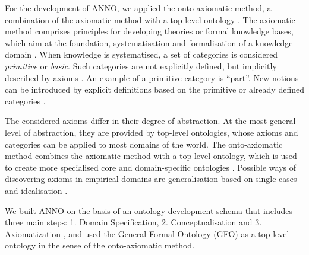 \documentclass[sw]{iosart2x}
\begin{document}

For the development of ANNO, we applied the onto-axiomatic method, a combination of the axiomatic method with a top-level ontology \citep{baumann2014, herre2010}.
The axiomatic method comprises principles for developing theories or formal knowledge bases, which aim at the foundation, systematisation and formalisation of a knowledge domain \citep{baumann2014, herre2010}.
When knowledge is systematised, a set of categories is considered \emph{primitive} or \emph{basic}.
Such categories are not explicitly defined, but implicitly described by axioms \citep{Hilbert1918}.
An example of a primitive category is \enquote{part}.
New notions can be introduced by explicit definitions based on the primitive or already defined categories \citep{herre2010}.

The considered axioms differ in their degree of abstraction.
At the most general level of abstraction, they are provided by top-level ontologies, whose axioms and categories can be applied to most domains of the world.
The onto-axiomatic method combines the axiomatic method with a top-level ontology, which is used to create more specialised core and domain-specific ontologies \citep{baumann2014}.
Possible ways of discovering axioms in empirical domains are generalisation based on single cases and idealisation \citep{baumann2011}.

We built ANNO on the basis of an ontology development schema that includes three main steps: 1. Domain Specification, 2. Conceptualisation and 3. Axiomatization \citep{herre2010}, and used the General Formal Ontology (GFO) \citep{Loebe2022, Burek2020, herre2010} as a top-level ontology in the sense of the onto-axiomatic method.
\end{document}
